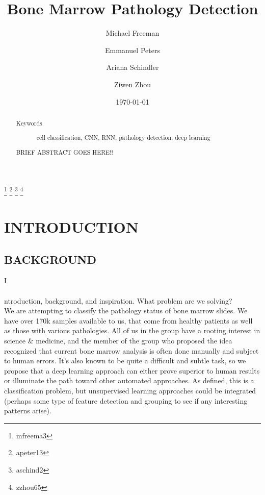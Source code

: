 \documentclass[%
 reprint,
 amsmath,amssymb,
 aps,
]{revtex4-1}
\begin{document}
\title{Bone Marrow Pathology Detection}

\thanks{mfreema3}
\thanks{apeter13}
\thanks{aschind2}
\thanks{zzhou65}

\author{Michael Freeman}
\author{Emmanuel Peters}
\author{Ariana Schindler}
\author{Ziwen Zhou}
\date{\today}




\begin{abstract}
	
\begin{description}
	\item[Keywords]
	cell classification, CNN, RNN, pathology detection, deep learning
\end{description}

BRIEF ABSTRACT GOES HERE!!

\end{abstract}




\maketitle


\section{\label{sec:level1}INTRODUCTION}


\subsection{\label{sec:level2}BACKGROUND}
\lettrine[nindent=0em,lines=3]{I} \\
\\
ntroduction, background, and inspiration. What problem are we solving? \\

We are attempting to classify the pathology status of bone marrow slides. We have over 170k samples available to us, that come from healthy patients as well as those with various pathologies. All of us in the group have a rooting interest in science \& medicine, and the member of the group who proposed the idea recognized that current bone marrow analysis is often done manually and subject to human errors. It's also known to be quite a difficult and subtle task, so we propose that a deep learning approach can either prove superior to human results or illuminate the path toward other automated approaches. As defined, this is a classification problem, but unsupervised learning approaches could be integrated (perhaps some type of feature detection and grouping to see if any interesting patterns arise). \\
\end{document}
